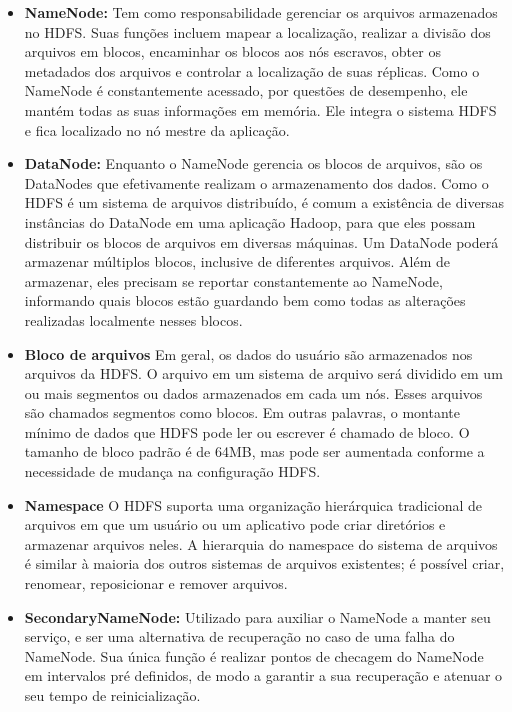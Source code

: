 \begin{itemize}
	\item \textbf{NameNode:}
    Tem como responsabilidade gerenciar os arquivos armazenados no HDFS. Suas funções incluem mapear a localização, realizar a divisão dos arquivos em blocos, encaminhar os blocos aos nós escravos, obter os metadados dos arquivos e controlar a localização de suas réplicas. Como o NameNode é constantemente acessado, por questões de desempenho, ele mantém todas as suas informações em memória. Ele integra o sistema HDFS e fica localizado no nó mestre da aplicação.
	
    \item \textbf{DataNode:}
    Enquanto o NameNode gerencia os blocos de arquivos, são os DataNodes que efetivamente realizam o armazenamento dos dados. Como o HDFS é um sistema de arquivos distribuído, é comum a existência de diversas instâncias do DataNode em uma aplicação Hadoop, para que eles possam distribuir os blocos de arquivos em diversas máquinas. Um DataNode poderá armazenar múltiplos blocos, inclusive de diferentes arquivos. Além de armazenar, eles precisam se reportar constantemente ao NameNode, informando quais blocos estão guardando bem como todas as alterações realizadas localmente nesses blocos.

	\item \textbf{Bloco de arquivos}
    Em geral, os dados do usuário são armazenados nos arquivos da HDFS. O arquivo em um sistema de arquivo será dividido em um ou mais segmentos ou dados armazenados em cada um nós. Esses arquivos são chamados segmentos como blocos. Em outras palavras, o montante mínimo de dados que HDFS pode ler ou escrever é chamado de bloco. O tamanho de bloco padrão é de 64MB, mas pode ser aumentada conforme a necessidade de mudança na configuração HDFS.
    
    \item \textbf{Namespace}
    O HDFS suporta uma organização hierárquica tradicional de arquivos em que um usuário ou um aplicativo pode criar diretórios e armazenar arquivos neles. A hierarquia do namespace do sistema de arquivos é similar à maioria dos outros sistemas de arquivos existentes; é possível criar, renomear, reposicionar e remover arquivos.
    

	\item \textbf{SecondaryNameNode:}
    Utilizado para auxiliar o NameNode a manter seu serviço, e ser uma alternativa de recuperação no caso de uma falha do NameNode. Sua única função é realizar pontos de checagem do NameNode em intervalos pré definidos, de modo a garantir a sua recuperação e atenuar o seu tempo de reinicialização.
\end{itemize}

